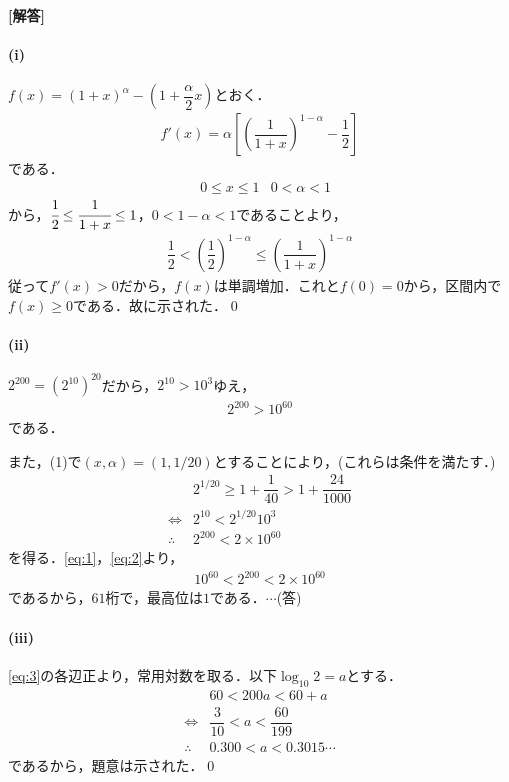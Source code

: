 \documentclass[../../main.tex]{subfiles}
\begin{document}
\begin{oframed}
  
\end{oframed}

{\bf [解答]}

\paragraph{(i)}

$f(x)=(1+x)^{\alpha}-\left(1+\dfrac{\alpha}{2}x\right)$とおく．
\begin{align}
  f'(x)=\alpha\left[\left(\dfrac{1}{1+x}\right)^{1-\alpha}-\dfrac{1}{2}\right]
\end{align}
である．
\begin{align}
  &0\le x\le1 &0<\alpha<1
\end{align}
から，$\cfrac{1}{2}\le\cfrac{1}{1+x}\le1$，$0<1-\alpha<1$であることより，
\begin{align}
  \dfrac{1}{2}<\left(\dfrac{1}{2}\right)^{1-\alpha}\le\left(\dfrac{1}{1+x}\right)^{1-\alpha}
\end{align}
従って$f'(x)>0$だから，$f(x)$は単調増加．これと$f(0)=0$から，区間内で$f(x)\ge0$である．故に示された．\qed

\paragraph{(ii)}
$2^{200}=(2^{10})^{20}$だから，$2^{10}>10^3$ゆえ，
\begin{align}
  2^{200}>10^{60}\label{eq:1}
\end{align}
である．

また，(1)で$(x,\alpha)=(1,1/20)$とすることにより，(これらは条件を満たす．)
\begin{align}
  &2^{1/20}\ge 1+\dfrac{1}{40}>1+\dfrac{24}{1000} \nonumber\\
  \Longleftrightarrow &2^{10}<2^{1/20}10^3 \nonumber\\
  \therefore \ &2^{200}<2×10^{60} \label{eq:2}
\end{align}
を得る．\cref{eq:1}，\cref{eq:2}より，
\begin{align}
  10^{60}<2^{200}<2×10^{60}\label{eq:3}
\end{align}
であるから，$61$桁で，最高位は$1$である．$\cdots$(答)

\paragraph{(iii)}
\cref{eq:3}の各辺正より，常用対数を取る．以下$\log_{10}2=a$とする．
\begin{align}
  &60<200a<60+a  \\
  \Longleftrightarrow &\dfrac{3}{10}<a<\dfrac{60}{199} \\
  \therefore \ &0.300<a<0.3015\cdots
\end{align}
であるから，題意は示された．\qed
\newpage
\end{document}

